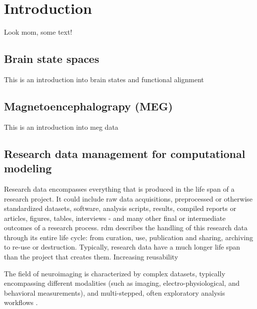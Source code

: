 
\chapter{Introduction}
\label{chap:k1}

Look mom, some text!

\section{Brain state spaces}
This is an introduction into brain states and functional alignment
\pagebreak

\section{Magnetoencephalograpy (MEG)}
This is an introduction into \gls{meg} data
\pagebreak

\section{Research data management for computational modeling}

Research data encompasses everything that is produced in the life span of a research project.
It could include raw data acquisitions, preprocessed or otherwise standardized datasets, software, analysis scripts, results, compiled reports or articles, figures, tables, interviews - and many other final or intermediate outcomes of a research process.
\gls{rdm} describes the handling of this research data through its entire life cycle: from curation, use, publication and sharing, archiving to re-use or destruction.
Typically, research data have a much longer life span than the project that creates them.
Increasing reusability

The field of neuroimaging is characterized by complex datasets, typically encompassing different modalities (such as imaging, electro-physiological, and behavioral measurements), and multi-stepped, often exploratory analysis workflows \citep{poline2011}.

